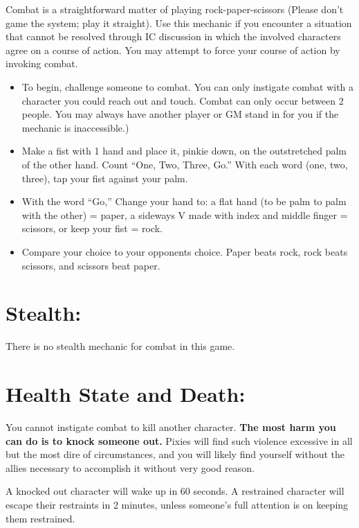 \documentclass[sheet]{PP}
\begin{document}
Combat is a straightforward matter of playing rock-paper-scissors (Please don't game the system; play it straight). Use this mechanic if you encounter a situation that cannot be resolved through IC discussion in which the involved characters agree on a course of action. You may attempt to force your course of action by invoking combat.

\begin{itemize}
	\item To begin, challenge someone to combat. You can only instigate combat with a character you could reach out and touch. Combat can only occur between 2 people. You may always have another player or GM stand in for you if the mechanic is inaccessible.) 
	\item Make a fist with 1 hand and place it, pinkie down, on the outstretched palm of the other hand. Count ``One, Two, Three, Go.'' With each word (one, two, three), tap your fist against your palm.
	\item With the word ``Go,'' Change your hand to: a flat hand (to be palm to palm with the other) = paper, a sideways V made with index and middle finger = scissors, or keep your fist = rock.
	\item Compare your choice to your opponents choice. Paper beats rock, rock beats scissors, and scissors beat paper.
\end{itemize}

\section*{Stealth:} There is no stealth mechanic for combat in this game.

\section*{Health State and Death:} You cannot instigate combat to kill another character. \textbf{The most harm you can do is to knock someone out.} Pixies will find such violence excessive in all but the most dire of circumstances, and you will likely find yourself without the allies necessary to accomplish it without very good reason.

A knocked out character will wake up in 60 seconds. A restrained character will escape their restraints in 2 minutes, unless someone's full attention is on keeping them restrained.
\end{document}
